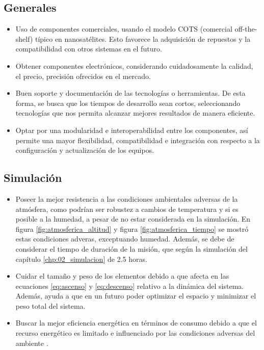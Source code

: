 \subsection{Generales}

\begin{itemize}

    \item Uso de componentes comerciales, usando el modelo COTS (comercial off-the-shelf) típico en nanosatélites.  Esto favorece la adquisición de repuestos y la compatibilidad con otros sistemas en el futuro.
    \item Obtener componentes electrónicos, considerando cuidadosamente  la calidad, el precio, precisión ofrecidos en el mercado.

    \item Buen soporte y documentación de las tecnologías o herramientas. De esta forma, se busca que los tiempos de desarrollo sean cortos, seleccionando tecnologías que nos permita alcanzar mejores resultados de manera eficiente.
    \item Optar por una modularidad e interoperabilidad entre los componentes, así permite una mayor flexibilidad, compatibilidad e integración con respecto a la configuración y actualización de los equipos.
\end{itemize}

\subsection{Simulación}

\begin{itemize}
    \item Poseer la mejor resistencia a las condiciones ambientales adversas de la atmósfera, como podrían ser robustez a cambios de temperatura y si es posible a la humedad, a pesar de no estar considerada en la simulación. En figura \ref{fig:atmosferica_altitud} y figura \ref{fig:atmosferica_tiempo} se mostró estas condiciones  adveras, exceptuando humedad. Además, se debe de considerar el tiempo de duración de la misión, que según la simulación del capítulo \ref{chp:02_simulacion}  de 2.5 horas.
    \item Cuidar el tamaño y peso de los elementos debido a que afecta en las ecuaciones \ref{eq:ascenso} y \ref{eq:descenso} relativo a la dinámica del sistema. Además, ayuda a que en un futuro poder optimizar el espacio y minimizar el peso total del sistema.
    \item Buscar la mejor eficiencia energética  en términos de consumo debido a que el recurso energético es limitado e influenciado por las condiciones adversas del ambiente \cite{condiciones_entorno_baterias}. 

\end{itemize}

